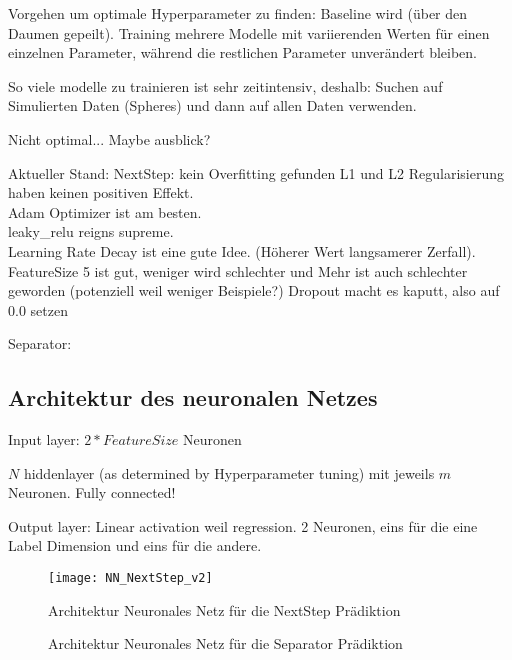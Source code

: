 Vorgehen um optimale Hyperparameter zu finden: 
Baseline wird (über den Daumen gepeilt).
Training mehrere Modelle mit variierenden Werten für einen einzelnen Parameter, 
während die restlichen Parameter unverändert bleiben.

So viele modelle zu trainieren ist sehr zeitintensiv, deshalb:
Suchen auf Simulierten Daten (Spheres) und dann auf allen Daten verwenden.

Nicht optimal... Maybe ausblick?


Aktueller Stand:
NextStep: kein Overfitting gefunden \textrightarrow L1 und L2 Regularisierung haben keinen positiven Effekt.\\
Adam Optimizer ist am besten.  \\
leaky\_relu reigns supreme. \\
Learning Rate Decay ist eine gute Idee. (Höherer Wert \textrightarrow langsamerer Zerfall). \\
FeatureSize 5 ist gut, weniger wird schlechter und Mehr ist auch schlechter geworden (potenziell weil weniger Beispiele?)
Dropout macht es kaputt, also auf 0.0 setzen

Separator: 

\subsection{Architektur des neuronalen Netzes}

Input layer: \(2 * FeatureSize\) Neuronen

\(N\) hiddenlayer (as determined by Hyperparameter tuning) mit jeweils \(m\) Neuronen.
Fully connected!

Output layer:
Linear activation weil regression.
2 Neuronen, eins für die eine Label Dimension und eins für die andere.

\begin{figure}[h]
    \centering
	\texttt{[image: NN\_NextStep\_v2]}
	\caption{Architektur Neuronales Netz für die NextStep Prädiktion}
	\label{fig:netArchitectureNextStep}
\end{figure}

\begin{figure}[h]
    \centering
	\caption{Architektur Neuronales Netz für die Separator Prädiktion}
	\label{fig:netArchitectureSep}
\end{figure}
